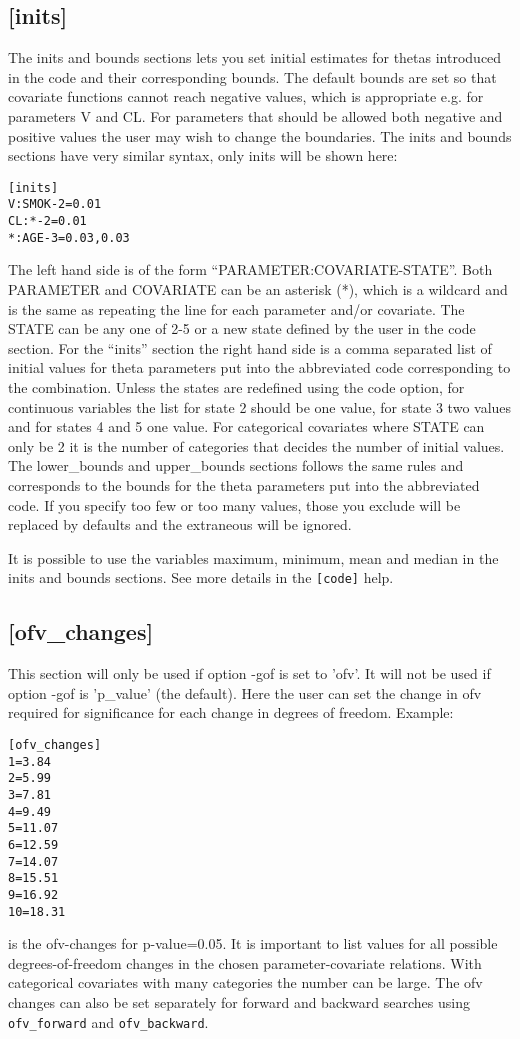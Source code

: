 \subsection{[inits]}
The inits and bounds sections lets you set initial estimates for thetas introduced in the code and their corresponding bounds. The default bounds are set so that covariate functions cannot reach negative values, which is appropriate e.g. for parameters V and CL. For parameters that should be allowed both negative and positive values the user may wish to change the boundaries. The inits and bounds sections have very similar syntax, only inits will be shown here:

\begin{verbatim}
[inits]
V:SMOK-2=0.01
CL:*-2=0.01
*:AGE-3=0.03,0.03
\end{verbatim}

The left hand side is of the form “PARAMETER:COVARIATE-STATE”. Both PARAMETER and COVARIATE can be an asterisk (*), which is a wildcard and is the same as repeating the line for each parameter and/or covariate. The STATE can be any one of 2-5 or a new state defined by the user in the code section. For the “inits” section the right hand side is a comma separated list of initial values for theta parameters put into the abbreviated code corresponding to the combination. Unless the states are redefined using the code option, for continuous variables the list for state 2 should be one value, for state 3 two values and for states 4 and 5 one value. For categorical covariates where STATE can only be 2 it is the number of categories that decides the number of initial values. The lower\_bounds and upper\_bounds sections follows the same rules and corresponds to the bounds for the theta parameters put into the abbreviated code. If you specify too few or too many values, those you exclude will be replaced by defaults and the extraneous will be ignored. 

It is possible to use the variables maximum, minimum, mean and median in the inits and bounds sections. See more details in the \verb|[code]| help. 

\subsection{[ofv\_changes]}
This section will only be used if option -gof is set to 'ofv'. It will not
be used if option -gof is 'p\_value' (the default). Here the user can set
the change in ofv required for significance
for each change in degrees of freedom.
Example:
\begin{verbatim}
[ofv_changes]
1=3.84
2=5.99
3=7.81
4=9.49
5=11.07
6=12.59
7=14.07
8=15.51
9=16.92
10=18.31
\end{verbatim}
is the ofv-changes for p-value=0.05. It is important to list values for all
possible degrees-of-freedom changes in the chosen parameter-covariate relations.
With categorical covariates with many categories the number can be large.
The ofv changes can also be set separately for forward and backward searches
using \verb|ofv_forward| and \verb|ofv_backward|.

